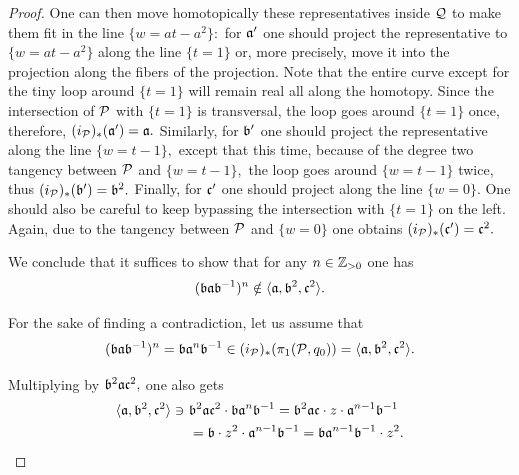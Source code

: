 \documentclass{article}
\begin{document}
\begin{proof}
One can then move homotopically these representatives inside $\mathcal{Q}$ to make them fit in the line $\{w=at-a^2\}:$ for $\mathfrak{a}'$ one should project the representative to $\{w=at-a^2\}$ along the line $\{t=1\}$ or, more precisely, move it into the projection along the fibers of the projection. Note that the entire curve except for the tiny loop around $\{t=1\}$ will remain real all along the homotopy. Since the intersection of $\mathcal{P}$ with $\{t=1\}$ is transversal, the loop goes around $\{t=1\}$ once, therefore, $(i_{\mathcal{P}})_*(\mathfrak{a}')=\mathfrak{a}.$ Similarly, for $\mathfrak{b}'$ one should project the representative along the line $\{w=t-1\},$ except that this time, because of the degree two tangency between $\mathcal{P}$ and $\{w=t-1\},$ the loop goes around $\{w=t-1\}$ twice, thus $(i_{\mathcal{P}})_*(\mathfrak{b}')=\mathfrak{b}^2.$ Finally, for $\mathfrak{c}'$ one should project along the line $\{w=0\}.$ One should also be careful to keep bypassing the intersection with $\{t=1\}$ on the left. Again, due to the tangency between $\mathcal{P}$ and $\{w=0\}$ one obtains $(i_{\mathcal{P}})_*(\mathfrak{c}')=\mathfrak{c}^2.$    




We conclude that it suffices to show that for any $n\in\mathbb{Z}_{>0}$ one has 
$$
(\mathfrak{b}\mathfrak{a}\mathfrak{b}^{-1})^n\notin \langle \mathfrak{a},\mathfrak{b}^2,\mathfrak{c}^2\rangle.
$$

For the sake of finding a contradiction, let us assume that 
$$
(\mathfrak{b}\mathfrak{a}\mathfrak{b}^{-1})^n=\mathfrak{b}\mathfrak{a}^n\mathfrak{b}^{-1}\in(i_{\mathcal{P}})_*(\pi_1(\mathcal{P},q_0))=\langle \mathfrak{a},\mathfrak{b}^2,\mathfrak{c}^2\rangle.
$$

Multiplying by $\mathfrak{b}^2\mathfrak{a}\mathfrak{c}^2,$ one also gets 
\begin{align*}
\langle \mathfrak{a},\mathfrak{b}^2,\mathfrak{c}^2\rangle\ni\ &\mathfrak{b}^2\mathfrak{a}\mathfrak{c}^2\cdot \mathfrak{b}\mathfrak{a}^n\mathfrak{b}^{-1}=\mathfrak{b}^2\mathfrak{a}\mathfrak{c}\cdot z \cdot \mathfrak{a}^{n-1}\mathfrak{b}^{-1}\\
&=\mathfrak{b}\cdot z^2\cdot \mathfrak{a}^{n-1}\mathfrak{b}^{-1}=\mathfrak{b}\mathfrak{a}^{n-1}\mathfrak{b}^{-1}\cdot z^2.
\end{align*}


\end{proof}
\end{document}
